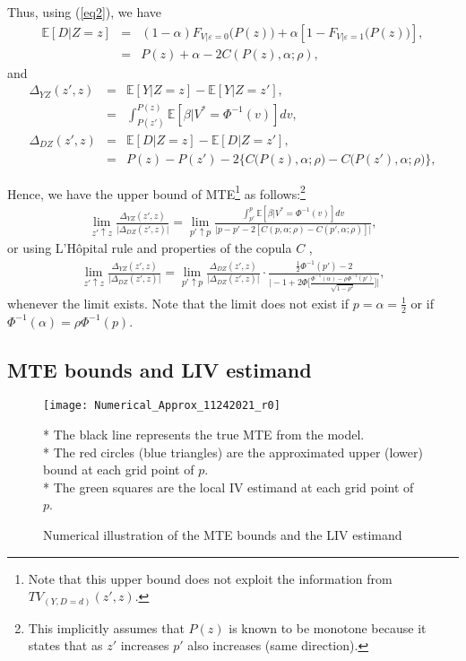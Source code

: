 \documentclass[11pt,reqno]{amsart}
\theoremstyle{plain}
\numberwithin{equation}{section}
\begin{document}
Thus, using (\ref{eq2}), we have
\begin{eqnarray*}
\mathbb E[D \vert Z=z] %
&=& (1-\alpha) F_{V \vert \varepsilon=0}\big(P(z)\big) + \alpha[1-F_{V \vert \varepsilon=1}\big(P(z)\big)], \\
&=& P(z) + \alpha - 2C(P(z), \alpha; \rho),
\end{eqnarray*}
and
\begin{eqnarray*}
\Delta_{YZ}(z', z) &=& \mathbb E[Y \vert Z=z] - \mathbb E[Y \vert Z=z'], \\
&=& \int^{P(z)}_{P(z')} \mathbb E[\beta \vert V^*=\Phi^{-1}(v)] dv,
\\
\Delta_{DZ}(z', z) &=& \mathbb E[D \vert Z=z] - \mathbb E[D \vert Z=z'], \\
&=& P(z) - P(z') - 2\Big\{ C\big(P(z), \alpha; \rho \big) - C\big(P(z'), \alpha; \rho \big) \Big\},
\end{eqnarray*}

Hence, we have the upper bound of MTE\footnote{Note that this upper bound does not exploit the information from $TV_{(Y,D=d)}(z',z)$.} as follows:\footnote{This implicitly assumes that $P(z)$ is known to be monotone because it states that as $z'$ increases $p'$ also increases (same direction).}
\begin{eqnarray*}
    \lim_{z' \uparrow z} \frac{\Delta_{YZ}(z',z)}{\vert \Delta_{DZ}(z',z) \vert} = \lim_{p' \uparrow p} \frac{\int^{p}_{p'} \mathbb E[\beta \vert V^*=\Phi^{-1}(v)] dv}{\vert p-p'- 2[ C(p, \alpha; \rho ) - C(p', \alpha; \rho ) ] \vert},
\end{eqnarray*}
or using L'H\^{o}pital rule and properties of the copula $C$ \citep{meyer2013bivariate}, 
\begin{eqnarray*}
    \lim_{z' \uparrow z} \frac{\Delta_{YZ}(z',z)}{\vert \Delta_{DZ}(z',z) \vert} = \lim_{p' \uparrow p} \frac{\Delta_{DZ}(z',z)}{\vert \Delta_{DZ}(z',z) \vert} \cdot \frac{\frac{1}{2}\Phi^{-1}(p')-2}{\Big\vert -1 + 2\Phi \big[\frac{\Phi^{-1}(\alpha)-\rho \Phi^{-1}(p')}{\sqrt{1-\rho^2}}\big] \Big\vert},
\end{eqnarray*}
whenever the limit exists.
Note that the limit does not exist if $p = \alpha = \frac{1}{2}$ or if $\Phi^{-1}(\alpha) = \rho \Phi^{-1}(p)$.

\subsection*{MTE bounds and LIV estimand}
\begin{figure}[h]
    \texttt{[image: Numerical\_Approx\_11242021\_r0]}\\
    \begin{flushleft}
	\footnotesize{* The black line represents the true MTE from the model.}\\
    \footnotesize{* The red circles (blue triangles) are the approximated upper (lower) bound at each grid point of $p$.}\\
     \footnotesize{* The green squares are the local IV estimand at each grid point of $p$.}
    \end{flushleft}
    \centering \caption{Numerical illustration of the MTE bounds and the LIV estimand}
	\label{fig.ey1.exam0921_r0}
\end{figure}
\clearpage
\end{document}
